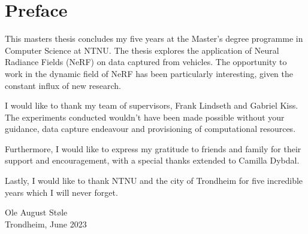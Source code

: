 \chapter*{Preface}

This masters thesis concludes my five years at the Master’s degree programme in Computer Science at NTNU. The thesis explores the application of Neural Radiance Fields (NeRF) on data captured from vehicles. The opportunity to work in the dynamic field of NeRF has been particularly interesting, given the constant influx of new research.

I would like to thank my team of supervisors, Frank Lindseth and Gabriel Kiss. The experiments conducted wouldn't have been made possible without your guidance, data capture endeavour and provisioning of computational resources.

Furthermore, I would like to express my gratitude to friends and family for their support and encouragement, with a special thanks extended to Camilla Dybdal. 

Lastly, I would like to thank NTNU and the city of Trondheim for five incredible years which I will never forget.

\vspace{3cm}
\begin{center}
    Ole August Støle \\
    Trondheim, June 2023
\end{center}